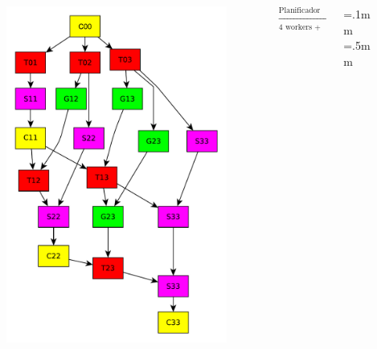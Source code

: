 \documentclass[10pt]{beamer}
\begin{document}
\begin{frame}
  \begin{columns}[c]%
    \begin{column}{0.3\textwidth}
      \begin{figure}[tbh!]
        \begin{center}
          \includegraphics[scale=0.12]{Figures/4x4_TaskExample}
        \end{center}
      \end{figure}
    \end{column}
    \begin{column}{0.2\textwidth}
      $\xrightarrow[\text{4 workers + Biblioteca Asim.}]{\text{Planificador
          convencional}}$
    \end{column}
    \begin{column}{0.4\textwidth}
      \centering
      \fboxsep=.1mm \fboxrule=.5mm


\end{column}
\end{columns}
\end{frame}
\end{document}

